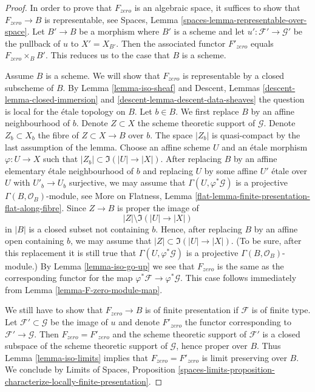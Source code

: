 \begin{proof}
In order to prove that $F_{zero}$ is an algebraic space, it suffices
to show that $F_{zero} \to B$ is representable, see
Spaces, Lemma \ref{spaces-lemma-representable-over-space}.
Let $B' \to B$ be a morphism where $B'$ is a scheme and let
$u' : \mathcal{F}' \to \mathcal{G}'$ be the pullback of $u$ to $X' = X_{B'}$.
Then the associated functor $F'_{zero}$ equals $F_{zero} \times_B B'$.
This reduces us to the case that $B$ is a scheme.

\medskip\noindent
Assume $B$ is a scheme. We will show that $F_{zero}$ is representable
by a closed subscheme of $B$. By Lemma \ref{lemma-iso-sheaf} and
Descent, Lemmas \ref{descent-lemma-closed-immersion} and
\ref{descent-lemma-descent-data-sheaves}
the question is local for the \'etale topology on $B$. Let $b \in B$.
We first replace $B$ by an affine neighbourhood of $b$.
Denote $Z \subset X$ the scheme theoretic support of $\mathcal{G}$.
Denote $Z_b \subset X_b$ the fibre of $Z \subset X \to B$ over $b$.
The space $|Z_b|$ is quasi-compact by the last assumption of the lemma.
Choose an affine scheme $U$ and an \'etale morphism $\varphi : U \to X$
such that $|Z_b| \subset \Im(|U| \to |X|)$. After replacing $B$ by an
affine elementary \'etale neighbourhood of $b$ and replacing $U$
by some affine $U'$ \'etale over $U$ with $U'_b \to U_b$ surjective,
we may assume that $\Gamma(U, \varphi^*\mathcal{G})$ is a projective
$\Gamma(B, \mathcal{O}_B)$-module, see
More on Flatness, Lemma \ref{flat-lemma-finite-presentation-flat-along-fibre}.
Since $Z \to B$ is proper the image of
$$
|Z| \setminus \Im(|U| \to |X|)
$$
in $|B|$ is a closed subset not containing $b$. Hence, after replacing
$B$ by an affine open containing $b$, we may assume that
$|Z| \subset \Im(|U| \to |X|)$. (To be sure, after this replacement
it is still true that $\Gamma(U, \varphi^*\mathcal{G})$ is a projective
$\Gamma(B, \mathcal{O}_B)$-module.) By Lemma \ref{lemma-iso-go-up}
we see that $F_{zero}$ is the same as the corresponding functor
for the map $\varphi^*\mathcal{F} \to \varphi^*\mathcal{G}$.
This case follows immediately from Lemma \ref{lemma-F-zero-module-map}.

\medskip\noindent
We still have to show that $F_{zero} \to B$ is of finite presentation if
$\mathcal{F}$ is of finite type. Let $\mathcal{F}' \subset \mathcal{G}$
be the image of $u$ and denote $F'_{zero}$ the functor corresponding
to $\mathcal{F}' \to \mathcal{G}$. Then $F_{zero} = F'_{zero}$ and
the scheme theoretic support of $\mathcal{F}'$ is a closed subspace of
the scheme theoretic support of $\mathcal{G}$, hence proper over $B$.
Thus Lemma \ref{lemma-iso-limits} implies that $F_{zero} = F'_{zero}$
is limit preserving over $B$. We conclude by Limits of Spaces, Proposition
\ref{spaces-limits-proposition-characterize-locally-finite-presentation}.
\end{proof}

